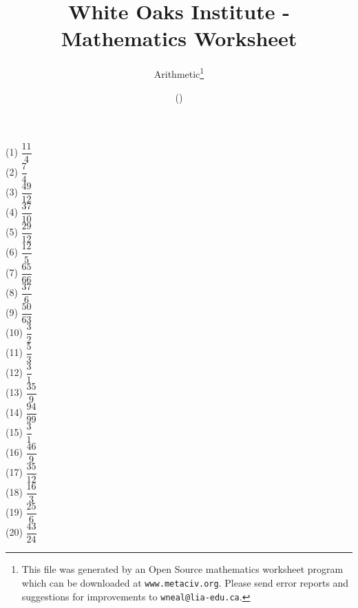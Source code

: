 \documentclass[letter]{article}
\begin{document}
\title{White Oaks Institute - Mathematics Worksheet}
\author{Arithmetic\thanks{This file was generated by an \textsf{Open Source} mathematics worksheet program which can be downloaded at \texttt{www.metaciv.org}. Please send error reports and suggestions for improvements to \texttt{wneal@lia-edu.ca}.}}
\date{\XCfileversion{} (\XCfiledate)}
\maketitle
\setlength{\parskip}{12mm plus 4mm minus 4mm}\setlength{\parindent}{0cm}\begin{multicols}{2}(1) $\dfrac{11}{4}$\\(2) $\dfrac{7}{4}$\\(3) $\dfrac{49}{12}$\\(4) $\dfrac{37}{10}$\\(5) $\dfrac{29}{12}$\\(6) $\dfrac{12}{5}$\\(7) $\dfrac{65}{66}$\\(8) $\dfrac{37}{6}$\\(9) $\dfrac{50}{63}$\\(10) $\dfrac{3}{2}$\\(11) $\dfrac{5}{3}$\\(12) $\dfrac{3}{1}$\\(13) $\dfrac{35}{9}$\\(14) $\dfrac{94}{99}$\\(15) $\dfrac{3}{1}$\\(16) $\dfrac{46}{9}$\\(17) $\dfrac{35}{12}$\\(18) $\dfrac{16}{3}$\\(19) $\dfrac{25}{6}$\\(20) $\dfrac{43}{24}$\\\end{multicols}
\end{document}
